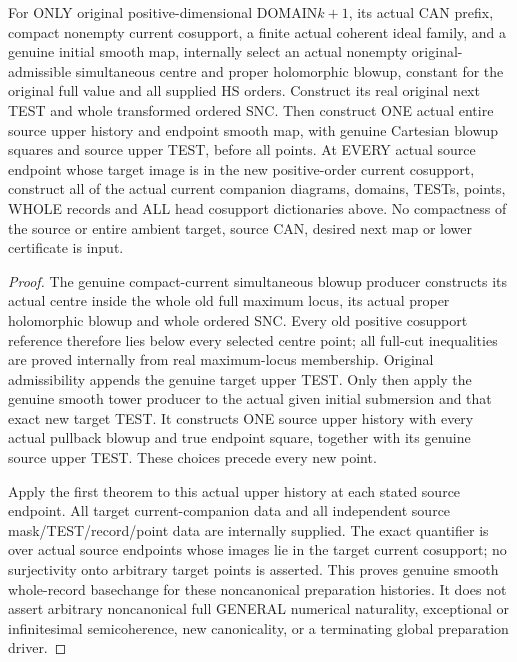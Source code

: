 \begin{theorem}
\label{hir:original-compact-prepared-companion-one-smooth-history}
\leanok
For ONLY original positive-dimensional DOMAIN$k+1$, its actual CAN prefix,
compact nonempty current cosupport, a finite actual coherent ideal family,
and a genuine initial smooth map, internally select an actual nonempty
original-admissible simultaneous centre and proper holomorphic blowup,
constant for the original full value and all supplied HS orders. Construct
its real original next TEST and whole transformed ordered SNC. Then
construct ONE actual entire source upper history and endpoint smooth map,
with genuine Cartesian blowup squares and source upper TEST, before all
points. At EVERY actual source endpoint whose target image is in the new
positive-order current cosupport, construct all of the actual current
companion diagrams, domains, TESTs, points, WHOLE records and ALL head
cosupport dictionaries above. No compactness of the source or entire
ambient target, source CAN, desired next map or lower certificate is input.
\end{theorem}
\begin{proof}
The genuine compact-current simultaneous blowup producer constructs its
actual centre inside the whole old full maximum locus, its actual proper
holomorphic blowup and whole ordered SNC. Every old positive cosupport
reference therefore lies below every selected centre point; all full-cut
inequalities are proved internally from real maximum-locus membership.
Original admissibility appends the genuine target upper TEST. Only then
apply the genuine smooth tower producer to the actual given initial
submersion and that exact new target TEST. It constructs ONE source upper
history with every actual pullback blowup and true endpoint square, together
with its genuine source upper TEST. These choices precede every new point.

Apply the first theorem to this actual upper history at each stated source
endpoint. All target current-companion data and all independent source
mask/TEST/record/point data are internally supplied. The exact quantifier
is over actual source endpoints whose images lie in the target current
cosupport; no surjectivity onto arbitrary target points is asserted. This
proves genuine smooth whole-record basechange for these noncanonical
preparation histories. It does not assert arbitrary noncanonical full
GENERAL numerical naturality, exceptional or infinitesimal semicoherence,
new canonicality, or a terminating global preparation driver.
\end{proof}
